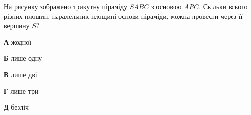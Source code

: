 \documentclass[12pt]{article}
\begin{document}
\begin{samepage}
\noindent\zadnum \begin{minipage}[t]{0.52\textwidth}
На рисунку зображено трикутну піраміду $SABC$ з основою $ABC$. Скільки всього різних площин, паралельних площині основи піраміди, можна провести через її вершину $S$? 

\nopagebreak\nbvspace{0.3cm}
\textbf{А} \quad жодної

\textbf{Б} \quad лише одну

\textbf{В} \quad лише дві

\textbf{Г} \quad лише три

\textbf{Д} \quad безліч
\end{minipage}
\hfill
\begin{minipage}[t]{0.40\textwidth}
\nopagebreak\nbvspace{-0.3cm}
\begin{center}
\begin{nmtfit}\end{nmtfit}
\end{center}
\end{minipage}

\nmtnobreak
\nopagebreak\nbvspace{0.5cm}
\par{}\vspace{0.25cm}
\end{samepage}
\end{document}
